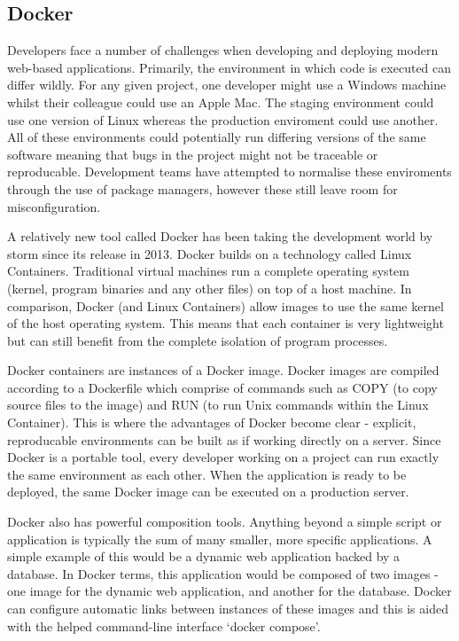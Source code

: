     \subsection{Docker}
      Developers face a number of challenges when developing and deploying modern web-based applications. Primarily, the environment in which code is executed can differ wildly. For any given project, one developer might use a Windows machine whilst their colleague could use an Apple Mac. The staging environment could use one version of Linux whereas the production enviroment could use another. All of these environments could potentially run differing versions of the same software meaning that bugs in the project might not be traceable or reproducable. Development teams have attempted to normalise these enviroments through the use of package managers, however these still leave room for misconfiguration.

      A relatively new tool called Docker has been taking the development world by storm since its release in 2013. Docker builds on a technology called Linux Containers. Traditional virtual machines run a complete operating system (kernel, program binaries and any other files) on top of a host machine. In comparison, Docker (and Linux Containers) allow images to use the same kernel of the host operating system. This means that each container is very lightweight but can still benefit from the complete isolation of program processes.

      Docker containers are instances of a Docker image. Docker images are compiled according to a Dockerfile which comprise of commands such as COPY (to copy source files to the image) and RUN (to run Unix commands within the Linux Container). This is where the advantages of Docker become clear - explicit, reproducable environments can be built as if working directly on a server. Since Docker is a portable tool, every developer working on a project can run exactly the same environment as each other. When the application is ready to be deployed, the same Docker image can be executed on a production server.

      Docker also has powerful composition tools. Anything beyond a simple script or application is typically the sum of many smaller, more specific applications. A simple example of this would be a dynamic web application backed by a database. In Docker terms, this application would be composed of two images - one image for the dynamic web application, and another for the database. Docker can configure automatic links between instances of these images and this is aided with the helped command-line interface `docker compose'.

